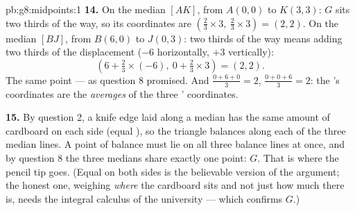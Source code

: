 \begin{solution}{pb:g8:midpoints:1}
\textbf{14.} On the median $[AK]$, from $A(0,0)$ to $K(3,3)$: $G$
sits two thirds of the way, so its coordinates are
$\left(\frac23 \times 3,\ \frac23 \times 3\right) = (2, 2)$. On
the median $[BJ]$, from $B(6, 0)$ to $J(0, 3)$: two thirds of the
way means adding two thirds of the displacement ($-6$
horizontally, $+3$ vertically):
\[
\left(6 + \tfrac23 \times (-6),\ 0 + \tfrac23 \times 3\right)
= (2, 2) .
\]
The same point --- as question 8 promised. And
$\frac{0 + 6 + 0}{3} = 2$, $\frac{0 + 0 + 6}{3} = 2$: the 's coordinates are the \emph{averages} of the three
' coordinates.

\textbf{15.} By question 2, a knife edge laid along a median has
the same amount of cardboard on each side (equal ), so the
triangle balances along each of the three median lines. A point
of balance must lie on all three balance lines at once, and by
question 8 the three medians share exactly one point: $G$. That
is where the pencil tip goes. (Equal  on both sides is the
believable version of the argument; the honest one, weighing
\emph{where} the cardboard sits and not just how much there is,
needs the integral calculus of the university  --- which
confirms $G$.)
\end{solution}
